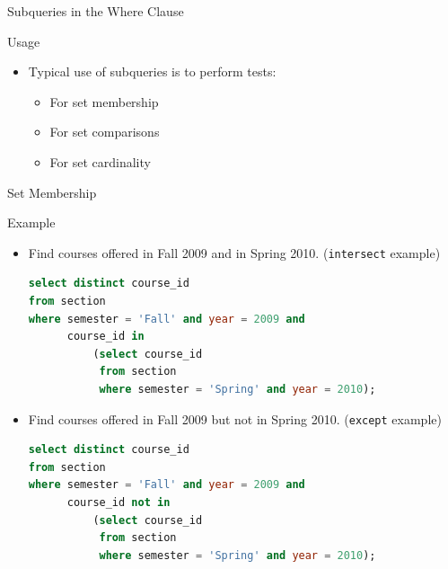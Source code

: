 \documentclass[aspectratio=169, xcolor=dvipsnames]{beamer}
\begin{document}
\begin{frame}{Subqueries in the Where Clause}
    \begin{block}{Usage}
        \begin{itemize}[<+->]
            \item Typical use of subqueries is to perform tests:
            \begin{itemize}
                \item[$\triangleright$] For set membership
                \item[$\triangleright$] For set comparisons
                \item[$\triangleright$] For set cardinality
            \end{itemize}
        \end{itemize}
    \end{block}
\end{frame}

\begin{frame}[fragile]{Set Membership}
    \begin{exampleblock}{Example}
        \begin{itemize}[<+->]
            \item Find courses offered in Fall 2009 and in Spring 2010. (\texttt{intersect} example)
            \begin{lstlisting}[language=SQL, basicstyle=\ttfamily\scriptsize]
select distinct course_id 
from section 
where semester = 'Fall' and year = 2009 and 
      course_id in 
          (select course_id 
           from section 
           where semester = 'Spring' and year = 2010);
            \end{lstlisting}
            \item Find courses offered in Fall 2009 but not in Spring 2010. (\texttt{except} example)
            \begin{lstlisting}[language=SQL, basicstyle=\ttfamily\scriptsize]
select distinct course_id 
from section 
where semester = 'Fall' and year = 2009 and 
      course_id not in 
          (select course_id 
           from section 
           where semester = 'Spring' and year = 2010);
            \end{lstlisting}
        \end{itemize}
    \end{exampleblock}
\end{frame}
\end{document}
